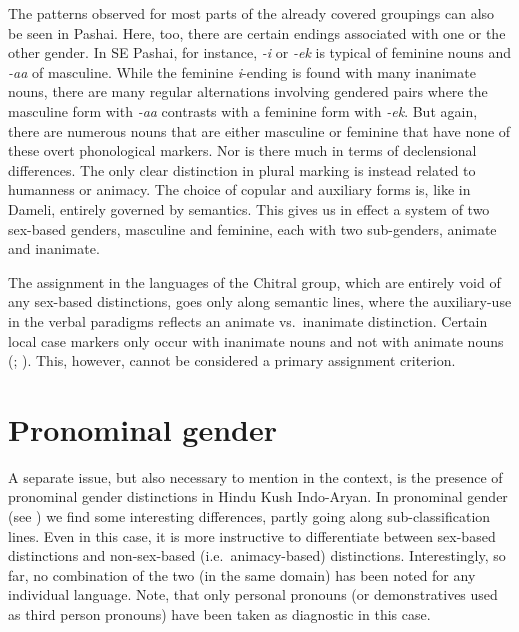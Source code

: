 \documentclass[output=collectionpaper]{langsci/langscibook}
\begin{document}
The patterns observed for most parts of the already covered groupings can also be seen in Pashai. Here, too, there are certain endings associated with one or the other gender. In SE Pashai, for instance, \textit{{}-i} or \textit{\nobreakdash-ek} is typical of feminine nouns and \textit{\nobreakdash-aa} of masculine. While the feminine \textit{i}{}-ending is found with many inanimate nouns, there are many regular alternations involving gendered pairs where the masculine form with \textit{\nobreakdash-aa} contrasts with a feminine form with \textit{\nobreakdash-ek}. But again, there are numerous nouns that are either masculine or feminine that have none of these overt phonological markers. Nor is there much in terms of declensional differences. The only clear distinction in plural marking is instead related to humanness or animacy. The choice of copular and auxiliary forms is, like in Dameli, entirely governed by semantics. This gives us in effect a system of two sex-based genders, masculine and feminine, each with two sub-genders, animate and inanimate.

The assignment in the languages of the Chitral group, which are entirely void of any sex-based distinctions, goes only along semantic lines, where the auxiliary-use in the verbal paradigms reflects an animate vs.\ inanimate distinction. Certain local case markers only occur with inanimate nouns and not with animate nouns (\citealt[53]{HeegardPetersen2006}; \citealt[844]{Bashir2003}). This, however, cannot be considered a primary assignment criterion.

\section{Pronominal gender}
\label{sec:Lilje:7}

A separate issue, but also necessary to mention in the context, is the presence of pronominal gender distinctions in Hindu Kush Indo-Aryan. In pronominal gender (see ) we find some interesting differences, partly going along sub-classification lines. Even in this case, it is more instructive to differentiate between sex-based distinctions and non-sex-based (i.e.\ animacy-based) distinctions. Interestingly, so far, no combination of the two (in the same domain) has been noted for any individual language. Note, that only personal pronouns (or demonstratives used as third person pronouns) have been taken as diagnostic in this case.
\end{document}
